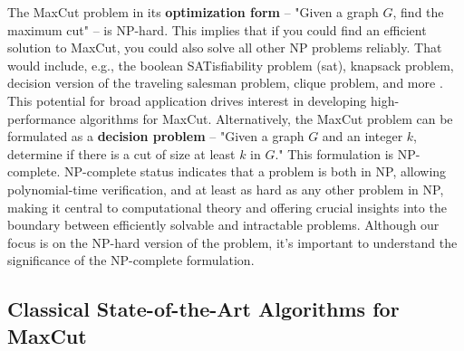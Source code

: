 The MaxCut problem in its \textbf{optimization form} – "Given a graph $G$, find the maximum cut" – is NP-hard. This implies that if you could find an efficient solution to MaxCut, you could also solve all other NP problems reliably. That would include, e.g., the boolean SATisfiability problem (\acrshort{sat}), knapsack problem, decision version of the traveling salesman problem, clique problem, and more \cite{NP-problems}. This potential for broad application drives interest in developing high-performance algorithms for MaxCut. Alternatively, the MaxCut problem can be formulated as a \textbf{decision problem} – "Given a graph $G$ and an integer $k$, determine if there is a cut of size at least $k$ in $G$." This formulation is NP-complete. NP-complete status indicates that a problem is both in NP, allowing polynomial-time verification, and at least as hard as any other problem in NP, making it central to computational theory and offering crucial insights into the boundary between efficiently solvable and intractable problems. Although our focus is on the NP-hard version of the problem, it's important to understand the significance of the NP-complete formulation.





\subsection{Classical State-of-the-Art Algorithms for MaxCut}
\label{section:Classical-State-of-the-Art}

